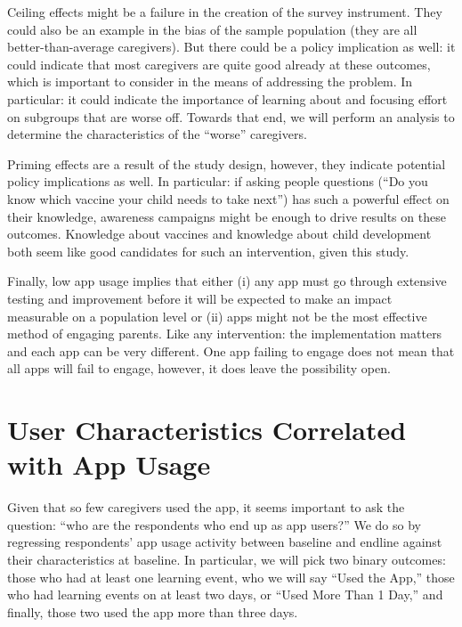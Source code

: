 \documentclass{article}
\begin{document}
Ceiling effects might be a failure in the creation of the survey instrument. They could also be an example in the bias of the sample population (they are all better-than-average caregivers). But there could be a policy implication as well: it could indicate that most caregivers are quite good already at these outcomes, which is important to consider in the means of addressing the problem. In particular: it could indicate the importance of learning about and focusing effort on subgroups that are worse off. Towards that end, we will perform an analysis to determine the characteristics of the ``worse'' caregivers.

Priming effects are a result of the study design, however, they indicate potential policy implications as well. In particular: if asking people questions (``Do you know which vaccine your child needs to take next'') has such a powerful effect on their knowledge, awareness campaigns might be enough to drive results on these outcomes. Knowledge about vaccines and knowledge about child development both seem like good candidates for such an intervention, given this study.

Finally, low app usage implies that either (i) any app must go through extensive testing and improvement before it will be expected to make an impact measurable on a population level or (ii) apps might not be the most effective method of engaging parents. Like any intervention: the implementation matters and each app can be very different. One app failing to engage does not mean that all apps will fail to engage, however, it does leave the possibility open.



\section{User Characteristics Correlated with App Usage}


Given that so few caregivers used the app, it seems important to ask the question: ``who are the respondents who end up as app users?'' We do so by regressing respondents' app usage activity between baseline and endline against their characteristics at baseline. In particular, we will pick two binary outcomes: those who had at least one learning event, who we will say ``Used the App,'' those who had learning events on at least two days, or ``Used More Than 1 Day,'' and finally, those two used the app more than three days.  
\end{document}

